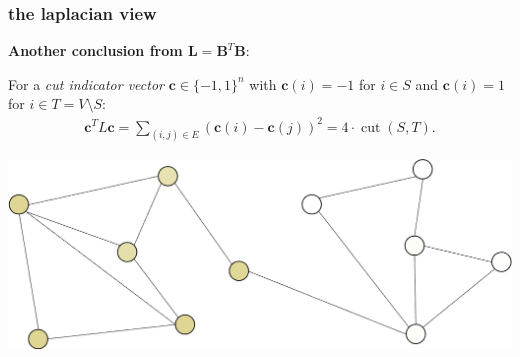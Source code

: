 \documentclass[compress]{beamer}
\newcommand{\bv}[1]{\mathbf{#1}}
\DeclareMathOperator*{\argmin}{arg\,min}
\DeclareMathOperator{\cut}{cut}
\begin{document}
\begin{frame}[t]
	\frametitle{the laplacian view}
	\textbf{Another conclusion from $\bv{L} = \bv{B}^T\bv{B}$}:
	
	For a \emph{cut indicator vector} $\bv{c} \in \{-1,1\}^n$ with $\bv{c}(i) = -1$ for $i \in S$ and $\bv{c}(i) = 1$ for $i \in T = V \setminus S$:
		\begin{align}
			 \bv{c}^T L \bv{c} = \sum_{(i,j)  \in E} (\bv{c}(i)- \bv{c}(j))^2 = 4 \cdot \cut(S,T).
		\end{align}
	
	\begin{center}
		\includegraphics[width=.8\textwidth]{smooth_func2.png}
	\end{center}
\end{frame}

	

	
\end{document}
